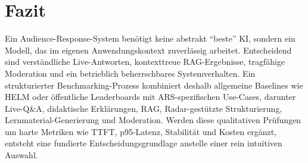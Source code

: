 \section{Fazit}

Ein Audience-Response-System benötigt keine abstrakt \enquote{beste} KI, sondern ein Modell, das im eigenen Anwendungskontext zuverlässig arbeitet. Entscheidend sind verständliche Live-Antworten, kontexttreue RAG-Ergebnisse, tragfähige Moderation und ein betrieblich beherrschbares Systemverhalten. Ein strukturierter Benchmarking-Prozess kombiniert deshalb allgemeine Baselines wie HELM oder öffentliche Leaderboards mit ARS-spezifischen Use-Cases, darunter Live-Q\&A, didaktische Erklärungen, RAG, Radar-gestützte Strukturierung, Lernmaterial-Generierung und Moderation. Werden diese qualitativen Prüfungen um harte Metriken wie TTFT, p95-Latenz, Stabilität und Kosten ergänzt, entsteht eine fundierte Entscheidungsgrundlage anstelle einer rein intuitiven Auswahl.
